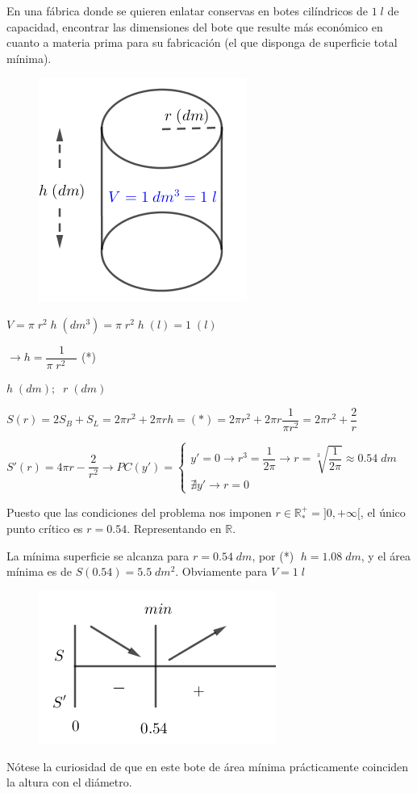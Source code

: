 	\begin{ejem} En una fábrica donde se quieren enlatar conservas en botes cilíndricos de $1 \; l$ de capacidad, encontrar las dimensiones del bote que resulte más económico en cuanto a materia prima para su fabricación (el que disponga de superficie total mínima).
	
	\begin{multicols}{2}
	
	\begin{figure}[H]
		\centering
		\includegraphics[width=.2\textwidth]{imagenes/imagenes05/T05IM11.png}
	\end{figure}
	
	$V=\pi\; r^2\; h \; (dm^3) = \pi\; r^2\; h \; (l) = 1 \; (l)$
	
	$ \to h=\dfrac {1}{\pi \; r^2 \quad}$ (*)

	$h \; (dm); \; \; r\; (dm)$
	
	
	\end{multicols}

	$S(r)=2S_B+S_L=2\pi r^2+2\pi r h=(*)=2\pi r^2 + 2 \pi r \dfrac {1}{\pi r^2}=2\pi r^2 + \dfrac 2 r$
	
	$S'(r)=4\pi r - \dfrac 2 {r^2} \to PC(y')= \begin{cases}
 	y'=0 \to r^3 = \dfrac {1}{2 \pi} \to r=\sqrt[3]{\dfrac {1}{2 \pi}} \approx 0.54\; dm \\
 	\nexists y' \to r=0
 	\end{cases}$	
 	
 	Puesto que las condiciones del problema nos imponen $r \in \mathbb R_*^+=]0,+\infty[$, el único punto crítico es $r=0.54$. Representando en $\mathbb R$.
 	
 	\begin{multicols}{2}
 	
 	La mínima superficie se alcanza para $r=0.54\; dm$, por (*) $\; h=1.08\; dm$, y el área mínima es de $S(0.54)=5.5\; dm^2$. Obviamente para $V=1\; l$
 	
 	\begin{figure}[H]
	\centering
	\includegraphics[width=.3\textwidth]{imagenes/imagenes05/T05IM12.png}
	\end{figure}
	
 	\end{multicols}
 	
 	Nótese la curiosidad de que en este bote de área mínima prácticamente coinciden la altura con el diámetro.

	\end{ejem}

